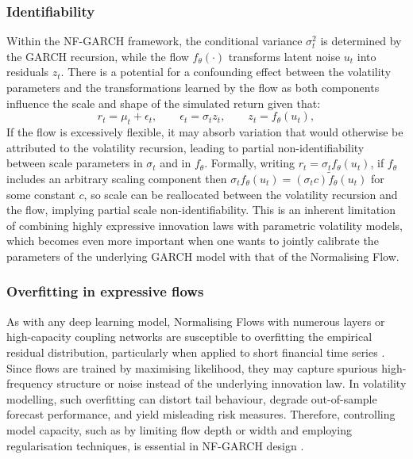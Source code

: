 \documentclass[risks,article,submit,pdftex,moreauthors]{Definitions/mdpi}
\begin{document}
\subsubsection{Identifiability}
Within the NF-GARCH framework, the conditional variance $\sigma_t^2$ is determined by the GARCH recursion, while the flow $f_\theta(\cdot)$ transforms latent noise $u_t$ into residuals $z_t$. There is a potential for a confounding effect between the volatility parameters and the transformations learned by the flow as both components influence the scale and shape of the simulated return given that:
\[
r_t = \mu_t + \epsilon_t, \qquad \epsilon_t = \sigma_t z_t, \qquad z_t = f_\theta(u_t),
\]
If the flow is excessively flexible, it may absorb variation that would otherwise be attributed to the volatility recursion, leading to partial non-identifiability between scale parameters in $\sigma_t$ and in $f_\theta$. Formally, writing $r_t = \sigma_t f_\theta(u_t)$, if $f_\theta$ includes an arbitrary scaling component then $\sigma_t f_\theta(u_t) = (\sigma_t c) \tilde{f}_\theta(u_t)$ for some constant $c$, so scale can be reallocated between the volatility recursion and the flow, implying partial scale non-identifiability. This is an inherent limitation of combining highly expressive innovation laws with parametric volatility models, which becomes even more important when one wants to jointly calibrate the parameters of the underlying GARCH model with that of the Normalising Flow.

\subsubsection{Overfitting in expressive flows}
As with any deep learning model, Normalising Flows with numerous layers or high-capacity coupling networks are susceptible to overfitting the empirical residual distribution, particularly when applied to short financial time series \citep{mongwe2025bayesian}. Since flows are trained by maximising likelihood, they may capture spurious high-frequency structure or noise instead of the underlying innovation law. In volatility modelling, such overfitting can distort tail behaviour, degrade out-of-sample forecast performance, and yield misleading risk measures. Therefore, controlling model capacity, such as by limiting flow depth or width and employing regularisation techniques, is essential in NF-GARCH design \citep{mongwe2025bayesian}.
\end{document}
